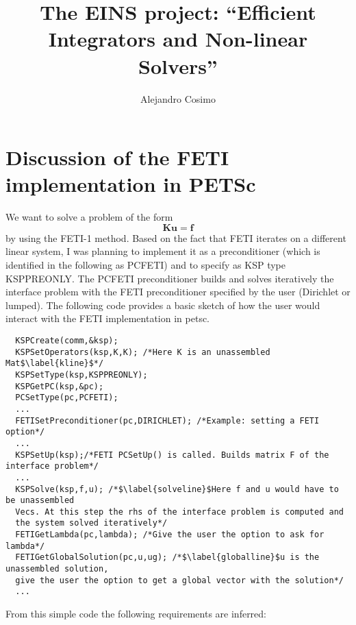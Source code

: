 \documentclass[a4paper,11pt]{report}
\begin{document}
\title{\color{blue}The EINS project: ``Efficient Integrators and
  Non-linear Solvers''}
\author{Alejandro Cosimo}

\maketitle
\tableofcontents

\chapter{Discussion of the FETI implementation in PETSc}

We want to solve a problem of the form
\begin{equation}
\bm{K u = f}
\end{equation}
by using the FETI-1 method. Based on the fact that FETI iterates on a
different linear system, I was planning to implement it as a
preconditioner (which is identified in the following as PCFETI) and to specify
as KSP type KSPPREONLY. The PCFETI preconditioner builds and solves
iteratively the interface problem with the FETI preconditioner specified by
the user (Dirichlet or lumped). The following code provides a basic
sketch of how the user would interact with the FETI implementation in
petsc.


\begin{verbatim}
  KSPCreate(comm,&ksp);
  KSPSetOperators(ksp,K,K); /*Here K is an unassembled Mat$\label{kline}$*/ 
  KSPSetType(ksp,KSPPREONLY);
  KSPGetPC(ksp,&pc);
  PCSetType(pc,PCFETI);
  ...
  FETISetPreconditioner(pc,DIRICHLET); /*Example: setting a FETI option*/
  ...
  KSPSetUp(ksp);/*FETI PCSetUp() is called. Builds matrix F of the interface problem*/
  ...
  KSPSolve(ksp,f,u); /*$\label{solveline}$Here f and u would have to be unassembled
  Vecs. At this step the rhs of the interface problem is computed and
  the system solved iteratively*/
  FETIGetLambda(pc,lambda); /*Give the user the option to ask for lambda*/
  FETIGetGlobalSolution(pc,u,ug); /*$\label{globalline}$u is the unassembled solution,
  give the user the option to get a global vector with the solution*/
  ...
\end{verbatim}

From this simple code the following requirements are inferred:
\end{document}
